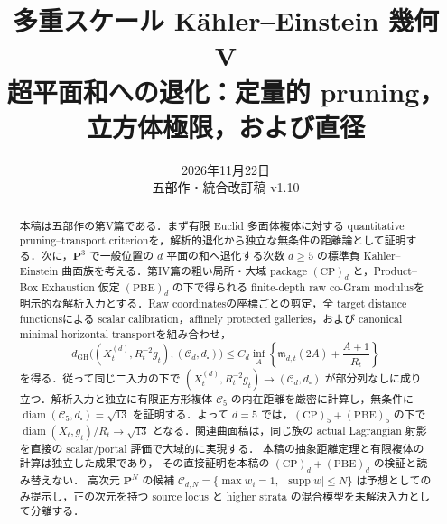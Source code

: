 \documentclass[a4paper,11pt]{ltjsarticle}
\title{\bfseries 多重スケール Kähler--Einstein 幾何 V\\[3mm]
\Large 超平面和への退化：定量的 pruning，立方体極限，および直径}
\author{}
\date{2026年11月22日\\五部作・統合改訂稿 v1.10}
\numberwithin{equation}{section}
\theoremstyle{plain}
\theoremstyle{definition}
\theoremstyle{remark}
\newcommand{\PP}{\mathbf P}
\begin{document}
\maketitle

\begin{abstract}
本稿は五部作の第V篇である．まず有限 Euclid 多面体複体に対する quantitative pruning--transport criterionを，解析的退化から独立な無条件の距離論として証明する．次に，$\PP^3$ で一般位置の $d$ 平面の和へ退化する次数 $d\ge5$ の標準負 Kähler--Einstein 曲面族を考える．第IV篇の粗い局所・大域 package $\mathrm{(CP)}_d$ と，Product--Box Exhaustion 仮定 $\mathrm{(PBE)}_d$ の下で得られる finite-depth raw co-Gram modulusを明示的な解析入力とする．Raw coordinatesの座標ごとの剪定，全 target distance functionsによる scalar calibration，affinely protected galleries，および canonical minimal-horizontal transportを組み合わせ，
\[
 d_{\mathrm{GH}}\bigl((X_t^{(d)},R_t^{-2}g_t),(\mathcal C_d,d_\square)\bigr)
 \le C_d\inf_A\left\{\mathfrak m_{d,t}(2A)+\frac{A+1}{R_t}\right\}
\]
を得る．従って同じ二入力の下で $(X_t^{(d)},R_t^{-2}g_t)\to(\mathcal C_d,d_\square)$ が部分列なしに成り立つ．解析入力と独立に有限正方形複体 $\mathcal C_5$ の内在距離を厳密に計算し，無条件に $\operatorname{diam}(\mathcal C_5,d_\square)=\sqrt{13}$ を証明する．よって $d=5$ では，$\mathrm{(CP)}_5+\mathrm{(PBE)}_5$ の下で $\operatorname{diam}(X_t,g_t)/R_t\to\sqrt{13}$ となる．関連曲面稿は，同じ族の actual Lagrangian 射影を直接の scalar/portal 評価で大域的に実現する．
本稿の抽象距離定理と有限複体の計算は独立した成果であり，
その直接証明を本稿の $\mathrm{(CP)}_d+\mathrm{(PBE)}_d$ の検証と読み替えない．
高次元 $\PP^N$ の候補 $\mathcal C_{d,N}=\{\max w_i=1,\ |\operatorname{supp}w|\le N\}$ は予想としてのみ提示し，正の次元を持つ source locus と higher strata の混合模型を未解決入力として分離する．
\end{abstract}
\end{document}

